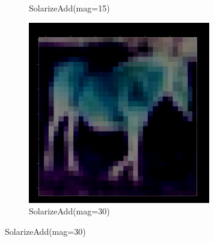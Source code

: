 \documentclass[onecolumn]{ujarticle}   %
\begin{document}
\begin{figure}[h]
\begin{subfigure}{0.3\columnwidth}
        \caption{SolarizeAdd(mag=15)}
        \label{fig:SolarizeAdd_15}
      \end{subfigure}
      \begin{subfigure}{0.3\columnwidth}
        \centering
        \includegraphics[width=1.0\columnwidth]{transform_test/SolarizeAdd_30.png}
        \caption{SolarizeAdd(mag=30)}
        \label{fig:SolarizeAdd_30}
      \end{subfigure}



\end{figure}
\end{document}
